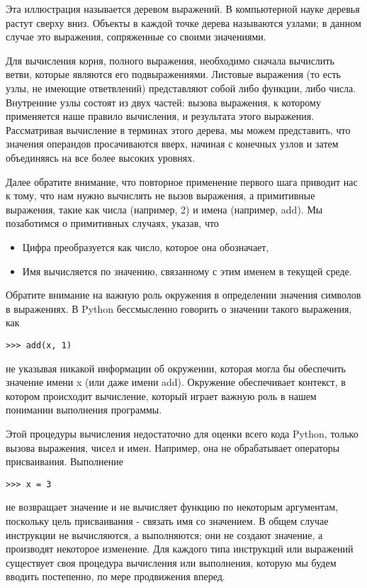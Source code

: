 Эта иллюстрация называется деревом выражений. В компьютерной науке деревья растут сверху вниз. Объекты в каждой точке дерева называются узлами; в данном случае это выражения, сопряженные со своими значениями.

Для вычисления корня, полного выражения, необходимо сначала вычислить ветви, которые являются его подвыражениями. Листовые выражения (то есть узлы, не имеющие ответвлений) представляют собой либо функции, либо числа. Внутренние узлы состоят из двух частей: вызова выражения, к которому применяется наше правило вычисления, и результата этого выражения. Рассматривая вычисление в терминах этого дерева, мы можем представить, что значения операндов просачиваются вверх, начиная с конечных узлов и затем объединяясь на все более высоких уровнях.

Далее обратите внимание, что повторное применение первого шага приводит нас к тому, что нам нужно вычислять не вызов выражения, а примитивные выражения, такие как числа (например, 2) и имена (например, add). Мы позаботимся о примитивных случаях, указав, что
\begin{itemize}
  \item Цифра преобразуется как число, которое она обозначает,
  \item Имя вычисляется по значению, связанному с этим именем в текущей среде.
\end{itemize}

Обратите внимание на важную роль окружения в определении значения символов в выражениях. В Python бессмысленно говорить о значении такого выражения, как
\begin{verbatim}
>>> add(x, 1)
\end{verbatim}

не указывая никакой информации об окружении, которая могла бы обеспечить значение имени x (или даже имени add). Окружение обеспечивает контекст, в котором происходит вычисление, который играет важную роль в нашем понимании выполнения программы.

Этой процедуры вычисления недостаточно для оценки всего кода Python, только вызова выражения, чисел и имен. Например, она не обрабатывает операторы присваивания. Выполнение
\begin{verbatim}
>>> x = 3
\end{verbatim}

не возвращает значение и не вычисляет функцию по некоторым аргументам, поскольку цель присваивания - связать имя со значением. В общем случае инструкции не вычисляются, а выполняются; они не создают значение, а производят некоторое изменение. Для каждого типа инструкций или выражений существует своя процедура вычисления или выполнения, которую мы будем вводить постепенно, по мере продвижения вперед.

